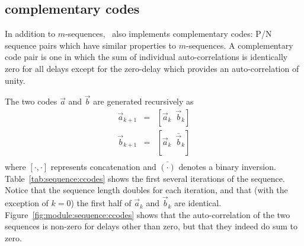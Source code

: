 \subsection{complementary codes}
\label{module:sequence:ccodes}
In addition to $m$-sequences, \liquid\ also implements complementary codes:
P/N sequence pairs which have similar properties to $m$-sequences.
A complementary code pair is one in which the sum of individual
auto-correlations is identically zero for all delays except for the zero-delay
which provides an auto-correlation of unity.

The two codes $\vec{a}$ and $\vec{b}$ are generated recursively as
\begin{eqnarray*}
    \vec{a}_{k+1} & = & \left[ \vec{a}_k \,\,\,      \vec{b}_k  \right] \\
    \vec{b}_{k+1} & = & \left[ \vec{a}_k \,\,\, \bar{\vec{b}}_k \right] \\
\end{eqnarray*}
where $[\cdot,\cdot]$ represents concatenation and
$\bar{(\cdot)}$ denotes a binary inversion.
Table~\ref{tab:sequence:ccodes} shows the first several iterations of the
sequence.
Notice that the sequence length doubles for each iteration, and that (with the
exception of $k=0$) the first half of $\vec{a}_k$ and $\vec{b}_k$ are
identical.
Figure~\ref{fig:module:sequence:ccodes} shows that the auto-correlation of the two
sequences is non-zero for delays other than zero, but that they indeed do sum
to zero.

